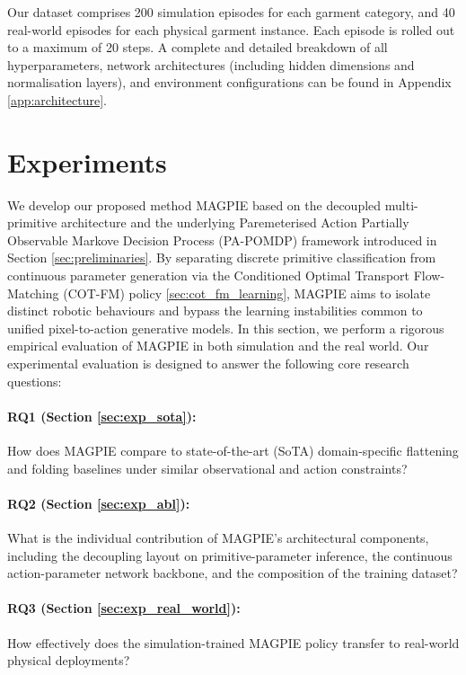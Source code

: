 \documentclass[journal]{IEEEtran}
\begin{document}
Our dataset comprises 200 simulation episodes for each garment category, and 40 real-world episodes for each physical garment instance. Each episode is rolled out to a maximum of 20 steps. A complete and detailed breakdown of all hyperparameters, network architectures (including hidden dimensions and normalisation layers), and environment configurations can be found in Appendix \ref{app:architecture}.



\section{Experiments}
\label{sec:experiments}

We develop our proposed method MAGPIE based on the decoupled multi-primitive architecture and the underlying Paremeterised Action Partially Observable Markove Decision Process (PA-POMDP) framework introduced in Section \ref{sec:preliminaries}. By separating discrete primitive classification from continuous parameter generation via the  Conditioned Optimal Transport Flow-Matching (COT-FM) policy \ref{sec:cot_fm_learning}, MAGPIE aims to isolate distinct robotic behaviours and bypass the learning instabilities common to unified pixel-to-action generative models. In this section, we perform a rigorous empirical evaluation of MAGPIE in both simulation and the real world. Our experimental evaluation is designed to answer the following core research questions:

\paragraph{RQ1 (Section \ref{sec:exp_sota}):} How does MAGPIE compare to state-of-the-art (SoTA) domain-specific flattening and folding baselines under similar observational and action constraints? 

\paragraph{RQ2 (Section \ref{sec:exp_abl}):} What is the individual contribution of MAGPIE's architectural components, including the decoupling layout on primitive-parameter inference, the continuous action-parameter network backbone, and the composition of the training dataset?

\paragraph{RQ3 (Section \ref{sec:exp_real_world}):} How effectively does the simulation-trained MAGPIE policy transfer to real-world physical deployments?
\end{document}
